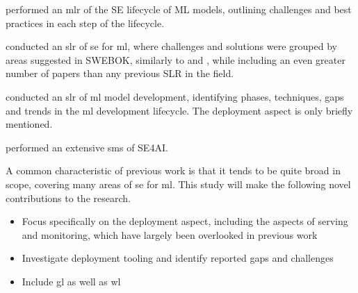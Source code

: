 \textcite{John2021} performed an \acrshort{mlr} of the SE lifecycle of ML models, outlining challenges and best practices in each step of the lifecycle.

\textcite{Giray2021} conducted an \acrshort{slr} of \acrshort{se} for \acrshort{ml}, where challenges and solutions were grouped by areas suggested in SWEBOK, similarly to \cite{Kumeno2020} and \cite{Nascimento2020}, while including an even greater number of papers than any previous SLR in the field.

\textcite{Lorenzoni2021} conducted an \acrshort{slr} of \acrshort{ml} model development, identifying phases, techniques, gaps and trends in the \acrshort{ml} development lifecycle.
The deployment aspect is only briefly mentioned.

\textcite{MartinezFernandez2021} performed an extensive \acrshort{sms} of SE4AI.



A common characteristic of previous work is that it tends to be quite broad in scope, covering many areas of \acrshort{se} for \acrshort{ml}.
This study will make the following novel contributions to the research.
\begin{itemize}
    \item Focus specifically on the deployment aspect, including the aspects of serving and monitoring, which have largely been overlooked in previous work
    \item Investigate deployment tooling and identify reported gaps and challenges
    \item Include \acrshort{gl} as well as \acrshort{wl}
\end{itemize}

